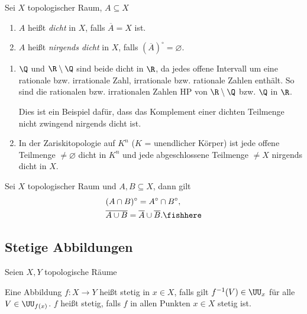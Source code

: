 \begin{defn}
\label{defn:1.1.14}
Sei $X$ topologischer Raum, $A\subseteq X$
\begin{enumerate}
  \item $A$ heißt \emph{dicht} in $X$, falls $\overline{A} = X$ ist.
  \item $A$ heißt \emph{nirgends dicht} in $X$, falls
  $\left(\overline{A}\right)^\circ = \varnothing$.\fishhere
\end{enumerate}
\end{defn}

\begin{bspn}
\begin{enumerate}[label=(\alph{*})]
\item $\Q$ und $\R\setminus \Q$ sind beide dicht in $\R$, da jedes offene
  Intervall um eine rationale bzw. irrationale Zahl, irrationale bzw. rationale
  Zahlen enthält. So sind die rationalen bzw. irrationalen Zahlen HP von
  $\R\setminus \Q$ bzw. $\Q$ in $\R$.
  
  Dies ist ein Beispiel dafür, dass das Komplement einer dichten Teilmenge
  nicht zwingend nirgends dicht ist.
  \item In der Zariskitopologie auf $K^n$ ($K$ = unendlicher Körper) ist jede
  offene Teilmenge $\neq \varnothing$ dicht in $K^n$ und jede abgeschlossene
  Teilmenge $\neq X$ nirgends dicht in $X$.\bsphere
\end{enumerate}
\end{bspn}

\begin{prop}
Sei $X$ topologischer Raum und $A,B\subseteq X$, dann gilt
\begin{align*}
& (A\cap B)^\circ = A^\circ \cap B^\circ,\\
& \overline{A\cup B} = \overline{A}\cup\overline{B}.\fishhere
\end{align*}
\end{prop}

\subsection{Stetige Abbildungen}
Seien $X,Y$ topologische Räume
\begin{bemn}
Eine Abbildung $f: X\to Y$ heißt stetig in $x\in X$, falls gilt $f^{-1}(V)\in
\UU_x$ für alle $V\in \UU_{f(x)}$. $f$ heißt stetig, falls $f$ in allen Punkten
$x\in X$ stetig ist.\maphere
\end{bemn}

